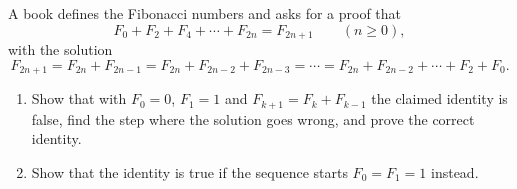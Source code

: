 A book defines the Fibonacci numbers and asks for a proof that
\[
F_0+F_2+F_4+\cdots+F_{2n}=F_{2n+1}\qquad(n\ge0),
\]
with the solution
\[
F_{2n+1}=F_{2n}+F_{2n-1}=F_{2n}+F_{2n-2}+F_{2n-3}=\cdots=F_{2n}+F_{2n-2}+\cdots+F_2+F_0 .
\]
\begin{enumerate}
\item Show that with $F_0=0$, $F_1=1$ and $F_{k+1}=F_k+F_{k-1}$ the claimed identity is false, find the step where the solution goes wrong, and prove the correct identity.
\item Show that the identity is true if the sequence starts $F_0=F_1=1$ instead.
\end{enumerate}
